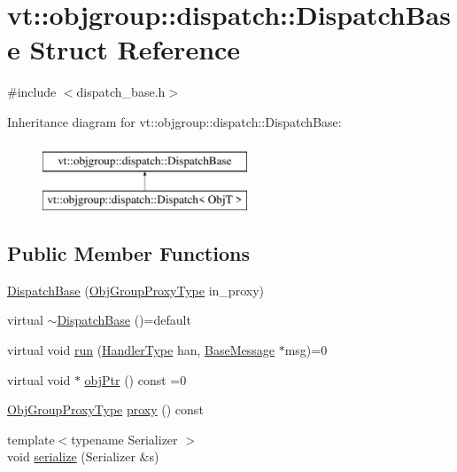 \hypertarget{structvt_1_1objgroup_1_1dispatch_1_1_dispatch_base}{}\section{vt\+:\+:objgroup\+:\+:dispatch\+:\+:Dispatch\+Base Struct Reference}
\label{structvt_1_1objgroup_1_1dispatch_1_1_dispatch_base}


{\ttfamily \#include $<$dispatch\+\_\+base.\+h$>$}

Inheritance diagram for vt\+:\+:objgroup\+:\+:dispatch\+:\+:Dispatch\+Base\+:\begin{figure}[H]
\begin{center}
\leavevmode
\includegraphics[height=2.000000cm]{structvt_1_1objgroup_1_1dispatch_1_1_dispatch_base}
\end{center}
\end{figure}
\subsection*{Public Member Functions}
\begin{DoxyCompactItemize}
\item 
\hyperlink{structvt_1_1objgroup_1_1dispatch_1_1_dispatch_base_ac6d83a669d4b1a30fbdc264de4d5bcb4}{Dispatch\+Base} (\hyperlink{namespacevt_ad7cae989df485fccca57f0792a880a8e}{Obj\+Group\+Proxy\+Type} in\+\_\+proxy)
\item 
virtual \hyperlink{structvt_1_1objgroup_1_1dispatch_1_1_dispatch_base_ad3a30bcc1ed4d045c208818d10b6cf96}{$\sim$\+Dispatch\+Base} ()=default
\item 
virtual void \hyperlink{structvt_1_1objgroup_1_1dispatch_1_1_dispatch_base_a539a57642138f35e38419e57e9138a2f}{run} (\hyperlink{namespacevt_af64846b57dfcaf104da3ef6967917573}{Handler\+Type} han, \hyperlink{namespacevt_ac34f95a5e2b8109b55bfba52b074443d}{Base\+Message} $\ast$msg)=0
\item 
virtual void $\ast$ \hyperlink{structvt_1_1objgroup_1_1dispatch_1_1_dispatch_base_ad0ba1baf3de179f6d6b749aedcd76490}{obj\+Ptr} () const =0
\item 
\hyperlink{namespacevt_ad7cae989df485fccca57f0792a880a8e}{Obj\+Group\+Proxy\+Type} \hyperlink{structvt_1_1objgroup_1_1dispatch_1_1_dispatch_base_a2ab9479966f207847a271999a510f53d}{proxy} () const
\item 
{\footnotesize template$<$typename Serializer $>$ }\\void \hyperlink{structvt_1_1objgroup_1_1dispatch_1_1_dispatch_base_a91c5d3536f40a006a2ad4d3473f30b36}{serialize} (Serializer \&s)
\end{DoxyCompactItemize}

